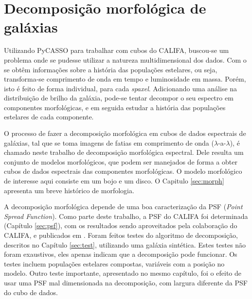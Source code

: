 
\section{Decomposição morfológica de galáxias}

Utilizando PyCASSO para trabalhar com cubos do CALIFA, buscou-se um problema
onde se pudesse utilizar a natureza multidimensional dos dados. Com o \starlight
se obtêm informações sobre a história das populações estelares, ou seja,
transforma-se comprimento de onda em tempo e luminosidade em massa. Porém, isto
é feito de forma individual, para cada {\em spaxel}. Adicionando uma análise na
distribuição de brilho da galáxia, pode-se tentar decompor o seu espectro em
componentes morfológicas, e em seguida estudar a história das populações
estelares de cada componente.

O processo de fazer a decomposição morfológica em cubos de dados espectrais de
galáxias, tal que se toma imagens de fatias em comprimento de onda
($\lambda$-a-$\lambda$), é chamado neste trabalho de decomposição morfológica
espectral. Dele resulta um conjunto de modelos morfológicos, que podem ser
manejados de forma a obter cubos de dados espectrais das componentes
morfológicas. O modelo morfológico de interesse aqui consiste em um bojo e um
disco. O Capitulo \ref{sec:morph} apresenta um breve histórico de morfologia.

A decomposição morfológica depende de uma boa caracterização da PSF ({\em Point
Spread Function}). Como parte deste trabalho, a PSF do CALIFA foi determinada
(Capítulo \ref{sec:psf}), com os resultados sendo aproveitados pela colaboração
do CALIFA, e publicados em \citet{GarciaBenito2015}. Foram feitos testes do
algoritmo de decomposição, descritos no Capítulo \ref{sec:test}, utilizando uma
galáxia sintética. Estes testes não foram exaustivos, eles apenas indicam que a
decomposição pode funcionar. Os testes incluem populações estelares compostas,
variáveis com a posição no modelo. Outro teste importante, apresentado no mesmo
capítulo, foi o efeito de usar uma PSF mal dimensionada na decomposição, com
largura diferente da PSF do cubo de dados.

